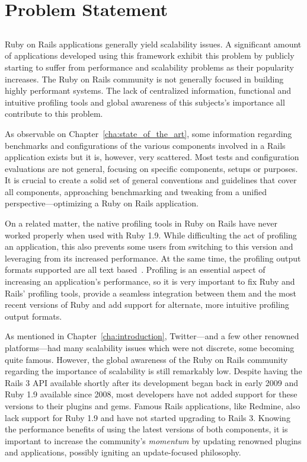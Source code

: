 \chapter{Problem Statement} %
\label{cha:problem_statement}

\section*{} %
Ruby on Rails applications generally yield scalability issues. A significant amount of applications developed using this framework exhibit this problem by publicly starting to suffer from performance and scalability problems as their popularity increases. The Ruby on Rails community is not generally focused in building highly performant systems. The lack of centralized information, functional and intuitive profiling tools and global awareness of this subjects's importance all contribute to this problem.

As observable on Chapter~\ref{cha:state_of_the_art}, some information regarding benchmarks and configurations of the various components involved in a Rails application exists but it is, however, very scattered. Most tests and configuration evaluations are not general, focusing on specific components, setups or purposes. It is crucial to create a solid set of general conventions and guidelines that cover all components, approaching benchmarking and tweaking from a unified perspective---optimizing a Ruby on Rails application.

On a related matter, the native profiling tools in Ruby on Rails have never worked properly when used with Ruby 1.9. While difficulting the act of profiling an application, this also prevents some users from switching to this version and leveraging from its increased performance. At the same time, the profiling output formats supported are all text based~\cite{testing_performance_old}. Profiling is an essential aspect of increasing an application's performance, so it is very important to fix Ruby and Rails' profiling tools, provide a seamless integration between them and the most recent versions of Ruby and add support for alternate, more intuitive profiling output formats.

As mentioned in Chapter~\ref{cha:introduction}, Twitter---and a few other renowned platforms---had many scalability issues which were not discrete, some becoming quite famous. However, the global awareness of the Ruby on Rails community regarding the importance of scalability is still remarkably low. Despite having the Rails 3 API available shortly after its development began back in early 2009 and Ruby 1.9 available since 2008, most developers have not added support for these versions to their plugins and gems. Famous Rails applications, like Redmine, also lack support for Ruby 1.9 and have not started upgrading to Rails 3. Knowing the performance benefits of using the latest versions of both components, it is important to increase the community's \textit{momentum} by updating renowned plugins and applications, possibly igniting an update-focused philosophy.

